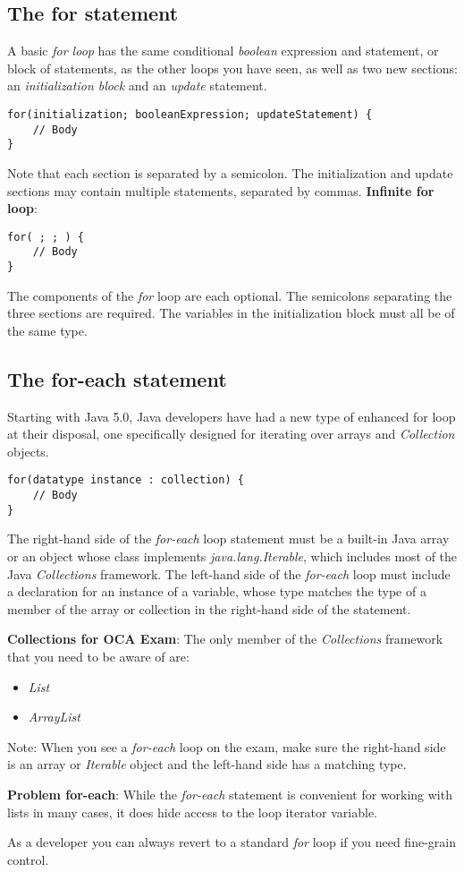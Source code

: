 \documentclass{article}
\begin{document}
\subsection{The for statement}
A basic \emph{for loop} has the same conditional \emph{boolean} expression and statement, or block of statements, as the other loops you have seen, as well as two new sections: an \emph{initialization block} and an \emph{update} statement.

\begin{lstlisting}
for(initialization; booleanExpression; updateStatement) {
	// Body
}
\end{lstlisting}
Note that each section is separated by a semicolon. The initialization and update sections may contain multiple statements, separated by commas.
\textbf{Infinite for loop}:
\begin{lstlisting}
for( ; ; ) {
	// Body
}
\end{lstlisting}
The components of the \emph{for} loop are each optional. The semicolons separating the three sections are required.
The variables in the initialization block must all be of the same type.
\subsection{The for-each statement}
Starting with Java 5.0, Java developers have had a new type of enhanced for loop at their disposal, one specifically designed for iterating over arrays and \emph{Collection} objects.
\begin{lstlisting}
for(datatype instance : collection) {
	// Body
}
\end{lstlisting}

The right-hand side of the \emph{for-each} loop statement must be a built-in Java array or an object whose class implements \emph{java.lang.Iterable}, which includes most of the Java \emph{Collections} framework.
The left-hand side of the \emph{for-each} loop must include a declaration for an instance of a variable, whose type matches the type of a member of the array or collection in the right-hand side of the statement.

\textbf{Collections for OCA Exam}: The only member of the \emph{Collections} framework that you need to be aware of are:
\begin{itemize}
	\item \emph{List}
	\item \emph{ArrayList}
\end{itemize}

Note: When you see a \emph{for-each} loop on the exam, make sure the right-hand side is an array or \emph{Iterable} object and the left-hand side has a matching type.

\textbf{Problem for-each}: While the \emph{for-each} statement is convenient for working with lists in many cases, it does hide access to the loop iterator variable.

As a developer you can always revert to a standard \emph{for} loop if you need fine-grain control.
\end{document}
